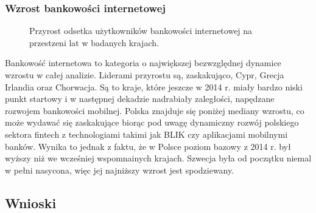 \documentclass[12pt]{article}
\begin{document}
\subsubsection{Wzrost bankowości internetowej}

\begin{figure}[H]
    
    \caption{Przyrost odsetka użytkowników bankowości internetowej na przestzeni lat w badanych krajach.}
\end{figure}


Bankowość internetowa to kategoria o największej bezwzględnej dynamice wzrostu w całej analizie. Liderami przyrostu są, zaskakująco, Cypr, Grecja
Irlandia oraz Chorwacja. Są to kraje, które jeszcze w 2014 r. miały bardzo niski punkt startowy i w następnej dekadzie nadrabiały zaległości,
napędzane rozwojem bankowości mobilnej. Polska znajduje się poniżej mediany wzrostu, co może wydawać się zaskakujące biorąc pod uwagę dynamiczny
rozwój polskiego sektora fintech z technologiami takimi jak BLIK czy aplikacjami mobilnymi banków. Wynika to jednak z faktu, że w Polsce poziom
bazowy z 2014 r. był wyższy niż we wcześniej wspomnainych krajach. Szwecja była od początku niemal w pełni nasycona, więc jej najniższy wzrost jest 
spodziewany.


\newpage
\subsection{Wnioski}
\end{document}
